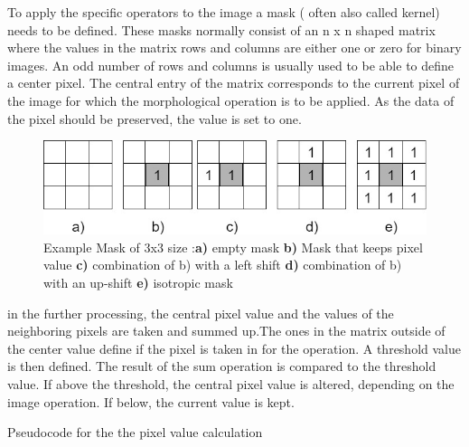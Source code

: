 To apply the specific operators to the image a mask ( often also called kernel) needs to be defined. These masks normally consist of an n x n shaped matrix where the values in the matrix rows and columns are either one or zero for binary images. An odd number of rows and columns is usually used to be able to define a center pixel. The central entry of the matrix corresponds to the current pixel of the image for which the morphological operation is to be applied. As the data of the pixel should be preserved, the value is set to one. 
\begin{figure}[H]
\includegraphics[width=\textwidth]{images/morpological_kernels.jpg}
\caption{ Example Mask of 3x3 size :\textbf{a)} empty mask \textbf{b)} Mask that keeps pixel value  \textbf{c)} combination of b) with a left shift   \textbf{d)} combination of b) with an up-shift   \textbf{e)} isotropic mask}
\label{morphological_ops} 
\end{figure}
in the further processing, the central pixel value and the values of the neighboring pixels are taken and summed up.The ones in the matrix outside of the center value define if the pixel is taken in for the operation. A threshold value is then defined. The result of the sum operation is compared to the threshold value. If above the threshold, the central pixel value is altered, depending on the image operation. If below, the current value is kept.
\begin{algorithm}
\SetAlgoLined
{}
\BlankLine
{}
\BlankLine
{}
\If{\Result $>=$ \Threshold}{\CentVal$=$ \OpVal}
\caption{Pseudocode for the the pixel value calculation}
\label{mask_calc_pseudocode}
\end{algorithm}

